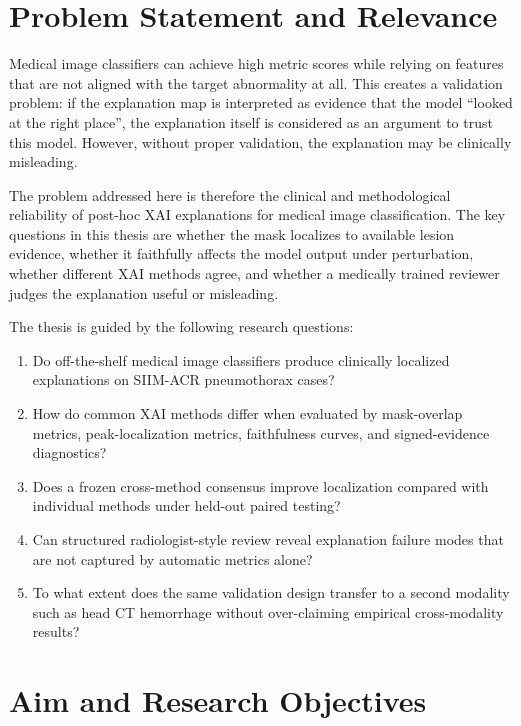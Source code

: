 \hypertarget{problem-statement-and-relevance}{%
	\section{Problem Statement and
		Relevance}\label{problem-statement-and-relevance}}

Medical image classifiers can achieve high metric scores 
while relying on features that are not aligned
with the target abnormality at all. This creates a validation
problem: if the explanation map is interpreted as evidence that the
model ``looked at the right place'', the explanation itself is considered
as an argument to trust this model. However, without proper validation, 
the explanation may be clinically misleading.

The problem addressed here is therefore the clinical and
methodological reliability of post-hoc XAI explanations for medical
image classification. The key questions in this thesis are whether
the mask localizes to available lesion evidence,
whether it faithfully affects the model output under perturbation,
whether different XAI methods agree, and whether a
medically trained reviewer judges the explanation useful or misleading.

The thesis is guided by the following research questions:

\begin{enumerate}
	\def\labelenumi{\arabic{enumi}.}
	\tightlist
	\item
	Do off-the-shelf medical image classifiers produce clinically
	localized explanations on SIIM-ACR pneumothorax cases?
	\item
	How do common XAI methods differ when evaluated by mask-overlap
	metrics, peak-localization metrics, faithfulness curves, and
	signed-evidence diagnostics?
	\item
	Does a frozen cross-method consensus improve localization compared
	with individual methods under held-out paired testing?
	\item
	Can structured radiologist-style review reveal explanation failure
	modes that are not captured by automatic metrics alone?
	\item
	To what extent does the same validation design transfer to a second
	modality such as head CT hemorrhage without over-claiming empirical
	cross-modality results?
\end{enumerate}

\hypertarget{aim-and-research-objectives}{%
	\section{Aim and Research
		Objectives}\label{aim-and-research-objectives}}

